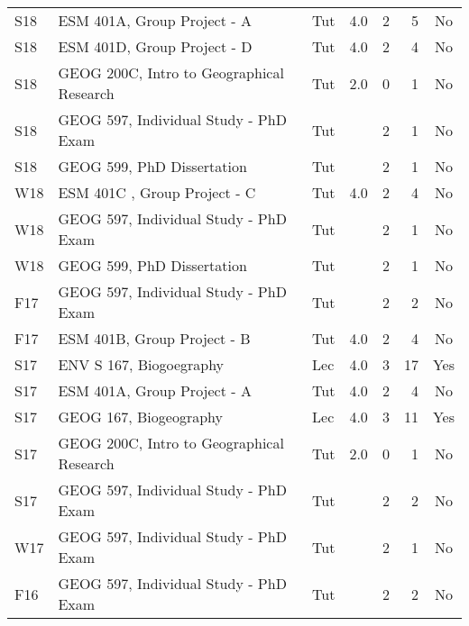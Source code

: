 
\begin{supertabular}{lp{6.5cm}lrrrc}
S18 & ESM 401A, Group Project - A & Tut & 4.0 & 2 & 5 & No \\
S18 & ESM 401D, Group Project - D & Tut & 4.0 & 2 & 4 & No \\
S18 & GEOG 200C, Intro to Geographical Research & Tut & 2.0 & 0 & 1 & No \\
S18 & GEOG 597, Individual Study - PhD Exam & Tut &  & 2 & 1 & No \\
S18 & GEOG 599, PhD Dissertation & Tut &  & 2 & 1 & No \\
W18 & ESM 401C , Group Project - C & Tut & 4.0 & 2 & 4 & No \\
W18 & GEOG 597, Individual Study - PhD Exam & Tut &  & 2 & 1 & No \\
W18 & GEOG 599, PhD Dissertation & Tut &  & 2 & 1 & No \\
F17 & GEOG 597, Individual Study - PhD Exam & Tut &  & 2 & 2 & No \\
F17 & ESM 401B, Group Project - B & Tut & 4.0 & 2 & 4 & No \\
S17 & ENV S 167, Biogoegraphy & Lec & 4.0 & 3 & 17 & Yes \\
S17 & ESM 401A, Group Project - A & Tut & 4.0 & 2 & 4 & No \\
S17 & GEOG 167, Biogeography & Lec & 4.0 & 3 & 11 & Yes \\
S17 & GEOG 200C, Intro to Geographical Research & Tut & 2.0 & 0 & 1 & No \\
S17 & GEOG 597, Individual Study - PhD Exam & Tut &  & 2 & 2 & No \\
W17 & GEOG 597, Individual Study - PhD Exam & Tut &  & 2 & 1 & No \\
F16 & GEOG 597, Individual Study - PhD Exam & Tut &  & 2 & 2 & No \\
\end{supertabular}

